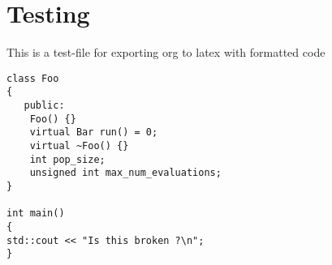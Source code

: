 \documentclass[a4paper,12pt]{article}
\author{Justin Kaipada}
\date{\today}
\title{}
\begin{document}
\section*{Testing}
\label{sec:orgf81c749}
This is a test-file for exporting org to latex with formatted code

\lstset{language=C++,label= ,caption= ,captionpos=b,numbers=none,frame=single,numbers=left,language=cpp}
\begin{lstlisting}
class Foo
{
   public:
    Foo() {}
    virtual Bar run() = 0;
    virtual ~Foo() {}
    int pop_size;
    unsigned int max_num_evaluations;
}

int main()
{
std::cout << "Is this broken ?\n";
}
\end{lstlisting}
\end{document}
